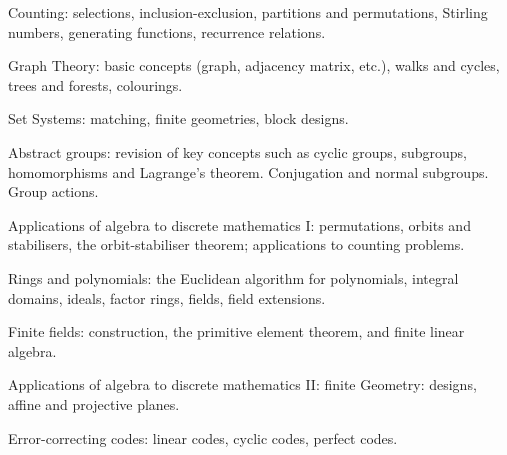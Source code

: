 Counting: selections, inclusion-exclusion, partitions and permutations, Stirling numbers, generating functions, recurrence relations.

Graph Theory: basic concepts (graph, adjacency matrix, etc.), walks and cycles, trees and forests, colourings.

Set Systems: matching, finite geometries, block designs.

Abstract groups: revision of key concepts such as cyclic groups, subgroups, homomorphisms and Lagrange’s theorem. Conjugation and normal subgroups. Group actions.

Applications of algebra to discrete mathematics I: permutations, orbits and stabilisers, the orbit-stabiliser theorem; applications to counting problems.

Rings and polynomials: the Euclidean algorithm for polynomials, integral domains, ideals, factor rings, fields, field extensions.

Finite fields: construction, the primitive element theorem, and finite linear algebra.

Applications of algebra to discrete mathematics II: finite Geometry: designs, affine and projective planes.

Error-correcting codes: linear codes, cyclic codes, perfect codes.
